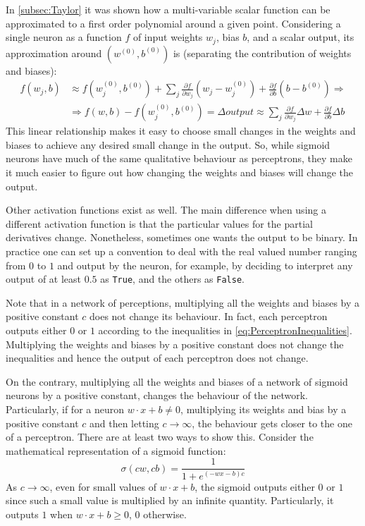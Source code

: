 \documentclass[12pt, letterpaper]{article}
\theoremstyle{definition}
\let\cd\lstinline
\begin{document}
In \autoref{subsec:Taylor} it was shown how a multi-variable scalar function can be approximated to a first order polynomial around a given point. Considering a single neuron as a function $f$ of input weights $w_j$, bias $b$, and a scalar output, its approximation around $(w^{(0)}, b^{(0)})$ is (separating the contribution of weights and biases):
\begin{equation}
\begin{aligned}
f(w_j, b) &\approx f(w_j^{(0)}, b^{(0)})+ \sum_ j\frac{\partial f}{\partial w_j} \left(w_j-w_j^{(0)}\right) +\frac{\partial f}{\partial b} \left(b-b^{(0)}\right) \Rightarrow\\
&\Rightarrow f(w, b) - f(w_j^{(0)}, b^{(0)} )= \Delta output \approx \sum_ j\frac{\partial f}{\partial w_j} \Delta w +\frac{\partial f}{\partial b} \Delta b
\end{aligned}
\label{eq:NNsmallChanges}
\end{equation}
This linear relationship makes it easy to choose small changes in the weights and biases to achieve any desired small change in the output. So, while sigmoid neurons have much of the same qualitative behaviour as perceptrons, they make it much easier to figure out how changing the weights and biases will change the output.

Other activation functions exist as well. The main difference when using a different activation function is that the particular values for the partial derivatives change. Nonetheless, sometimes one wants the output to be binary. In practice one can set up a convention to deal with the real valued number ranging from $0$ to $1$ and output by the neuron, for example, by deciding to interpret any output of at least $0.5$ as \cd+True+, and the others as \cd+False+.

Note that in a network of perceptions, multiplying all the weights and biases by a positive constant $c$ does not change its behaviour. In fact, each perceptron outputs either $0$ or $1$ according to the inequalities in \autoref{eq:PerceptronInequalities}. Multiplying the weights and biases by a positive constant does not change the inequalities and hence the output of each perceptron does not change.

On the contrary, multiplying all the weights and biases of a network of sigmoid neurons by a positive constant, changes the behaviour of the network. Particularly, if for a neuron $w\cdot x +b \ne 0$, multiplying its weights and bias by a positive constant $c$ and then letting $c\rightarrow \infty$, the behaviour gets closer to the one of a perceptron. There are at least two ways to show this. Consider the mathematical representation of a sigmoid function:
\begin{equation*}
\sigma(cw,cb) = \frac{1}{1+e^{(-wx-b)c}}
\end{equation*}
As $c\rightarrow \infty$, even for small values of $w\cdot x +b$, the sigmoid outputs either $0$ or $1$ since such a small value is multiplied by an infinite quantity. Particularly, it outputs $1$ when $w\cdot x+b\ge 0$, $0$ otherwise. 
\end{document}
